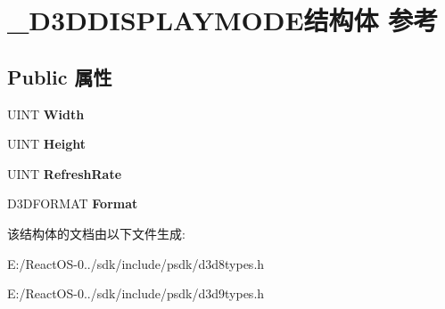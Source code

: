 \hypertarget{struct___d3_d_d_i_s_p_l_a_y_m_o_d_e}{}\section{\+\_\+\+D3\+D\+D\+I\+S\+P\+L\+A\+Y\+M\+O\+D\+E结构体 参考}
\label{struct___d3_d_d_i_s_p_l_a_y_m_o_d_e}
\subsection*{Public 属性}
\begin{DoxyCompactItemize}
\item 
\mbox{\label{struct___d3_d_d_i_s_p_l_a_y_m_o_d_e_a393da95d2f275636362a053052e775d7}} 
U\+I\+NT {\bfseries Width}
\item 
\mbox{\label{struct___d3_d_d_i_s_p_l_a_y_m_o_d_e_a138ecbad98643c1d2b4cc700914ffce0}} 
U\+I\+NT {\bfseries Height}
\item 
\mbox{\label{struct___d3_d_d_i_s_p_l_a_y_m_o_d_e_aab1b6e76eb452615827ff36dd37527e3}} 
U\+I\+NT {\bfseries Refresh\+Rate}
\item 
\mbox{\label{struct___d3_d_d_i_s_p_l_a_y_m_o_d_e_a4dbbf52109e03012962a6f23b3293e01}} 
D3\+D\+F\+O\+R\+M\+AT {\bfseries Format}
\end{DoxyCompactItemize}


该结构体的文档由以下文件生成\+:\begin{DoxyCompactItemize}
\item 
E\+:/\+React\+O\+S-\/0../sdk/include/psdk/d3d8types.\+h\item 
E\+:/\+React\+O\+S-\/0../sdk/include/psdk/d3d9types.\+h\end{DoxyCompactItemize}
